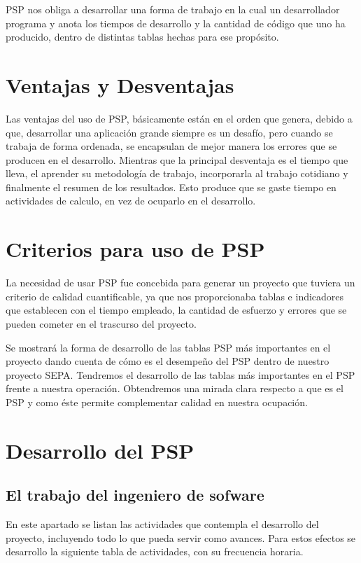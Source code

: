 \documentclass[a4paper,12pt,openany,oneside]{book}
\begin{document}
PSP nos obliga a desarrollar una forma de trabajo en la cual un desarrollador programa y anota los tiempos de desarrollo y la cantidad de código que uno ha producido, dentro de distintas tablas hechas para ese propósito.

\section{Ventajas y Desventajas}
Las ventajas del uso de PSP, básicamente están en el orden que genera, debido a que, desarrollar una aplicación grande siempre es un desafío, pero cuando se trabaja de forma ordenada, se encapsulan de mejor manera los errores que se producen en el desarrollo. Mientras que la principal desventaja es el tiempo que lleva, el aprender su metodología de trabajo, incorporarla al trabajo cotidiano y finalmente el resumen de los resultados. Esto produce que se gaste tiempo en actividades de calculo, en vez de ocuparlo en el desarrollo.

\section{Criterios para uso de PSP}
La necesidad de usar PSP fue concebida para generar un proyecto que tuviera un criterio de calidad cuantificable, ya que nos proporcionaba tablas e indicadores que establecen con el tiempo empleado, la cantidad de esfuerzo y errores que se pueden cometer en el trascurso del proyecto.

Se mostrará la forma de desarrollo de las tablas PSP más importantes en el proyecto dando cuenta de cómo es el desempeño del PSP dentro de nuestro proyecto SEPA. Tendremos el desarrollo de las tablas más importantes en el PSP frente a nuestra operación. Obtendremos una mirada clara respecto a que es el PSP y como éste permite complementar calidad en nuestra ocupación.

\section{Desarrollo del PSP}
\subsection{El trabajo del ingeniero de sofware}
En este apartado se listan las actividades que contempla el desarrollo del proyecto, incluyendo todo lo que pueda servir como avances. Para estos efectos se desarrollo la siguiente tabla de actividades, con su frecuencia horaria.
\end{document}
